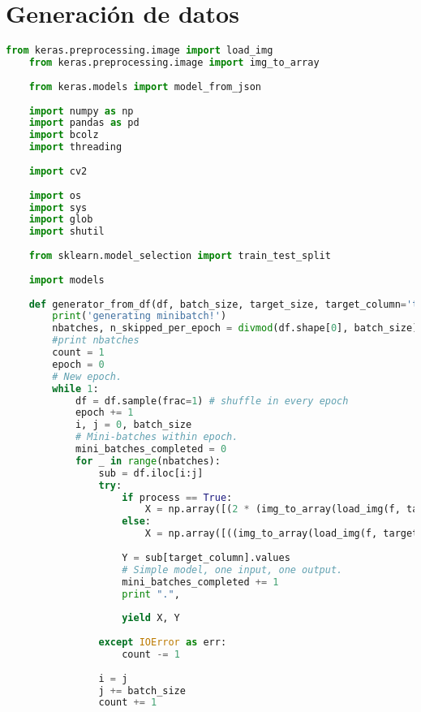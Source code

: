 \section{Generación de datos}
\begin{lstlisting}[title={utils.py},language=Python]
    from keras.preprocessing.image import load_img
    from keras.preprocessing.image import img_to_array
    
    from keras.models import model_from_json
    
    import numpy as np
    import pandas as pd
    import bcolz
    import threading
    
    import cv2
    
    import os
    import sys
    import glob
    import shutil
    
    from sklearn.model_selection import train_test_split
    
    import models
    
    def generator_from_df(df, batch_size, target_size, target_column='target', features=None, process=True):
        print('generating minibatch!')
        nbatches, n_skipped_per_epoch = divmod(df.shape[0], batch_size)
        #print nbatches
        count = 1
        epoch = 0
        # New epoch.
        while 1:
            df = df.sample(frac=1) # shuffle in every epoch
            epoch += 1
            i, j = 0, batch_size
            # Mini-batches within epoch.
            mini_batches_completed = 0
            for _ in range(nbatches):
                sub = df.iloc[i:j]
                try:
                    if process == True:
                        X = np.array([(2 * (img_to_array(load_img(f, target_size=target_size)) / 255.0 - 0.5)) for f in sub.imgpath])
                    else:
                        X = np.array([((img_to_array(load_img(f, target_size=target_size)))) for f in sub.imgpath])
                        
                    Y = sub[target_column].values
                    # Simple model, one input, one output.
                    mini_batches_completed += 1
                    print ".",
                    
                    yield X, Y
    
                except IOError as err:
                    count -= 1
    
                i = j
                j += batch_size
                count += 1
    
\end{lstlisting}


